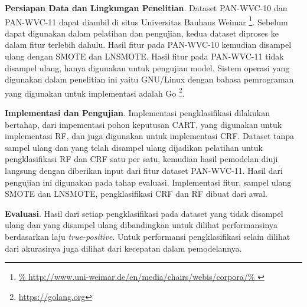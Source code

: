 \textbf{Persiapan Data dan Lingkungan Penelitian}.
Dataset PAN-WVC-10 dan PAN-WVC-11 dapat diambil di situs Universitas
Bauhaus Weimar
\footnote{%
	\RaggedRight\url{%
	http://www.uni-weimar.de/en/media/chairs/webis/corpora/%
}}.
Sebelum dapat digunakan dalam pelatihan dan pengujian, kedua dataset diproses
ke dalam fitur terlebih dahulu.
Hasil fitur pada PAN-WVC-10 kemudian disampel ulang dengan SMOTE dan LNSMOTE.
Hasil fitur pada PAN-WVC-11 tidak disampel ulang, hanya digunakan untuk
pengujian model.
Sistem operasi yang digunakan dalam penelitian ini yaitu GNU/Linux dengan
bahasa pemrograman yang digunakan untuk implementasi adalah Go
\footnote{\RaggedRight\url{https://golang.org}}.

\textbf{Implementasi dan Pengujian}.
Implementasi pengklasifikasi dilakukan bertahap, dari impementasi pohon
keputusan CART, yang digunakan untuk implementasi RF, dan juga
digunakan untuk implementasi CRF.
Dataset tanpa sampel ulang dan yang telah disampel ulang dijadikan
pelatihan untuk pengklasifikasi RF dan CRF satu per satu, kemudian hasil
pemodelan diuji langsung dengan diberikan input dari fitur dataset PAN-WVC-11.
Hasil dari pengujian ini digunakan pada tahap evaluasi.
Implementasi fitur, sampel ulang SMOTE dan LNSMOTE, pengklasifikasi CRF dan RF
dibuat dari awal.

\pagebreak
\textbf{Evaluasi}.
Hasil dari setiap pengklasifikasi pada dataset yang tidak disampel ulang dan
yang disampel ulang dibandingkan untuk dilihat performansinya berdasarkan laju
\textit{true-positive}.
Untuk performansi pengklasifikasi selain dilihat dari akurasinya juga dilihat
dari kecepatan dalam pemodelannya.
